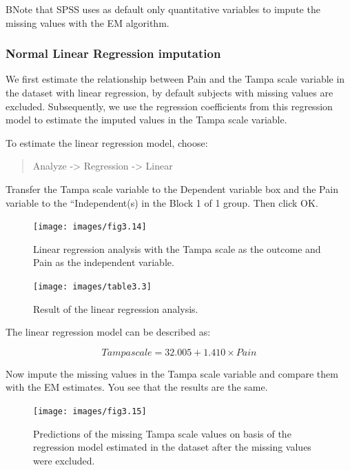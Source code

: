 \documentclass[
]{book}
\begin{document}
BNote that SPSS uses as default only quantitative variables to impute the missing values with the EM algorithm.

\hypertarget{normal-linear-regression-imputation}{%
\subsubsection{Normal Linear Regression imputation}\label{normal-linear-regression-imputation}}

We first estimate the relationship between Pain and the Tampa scale variable in the dataset with linear regression, by default subjects with missing values are excluded. Subsequently, we use the regression coefficients from this regression model to estimate the imputed values in the Tampa scale variable.

To estimate the linear regression model, choose:

\begin{quote}
Analyze -\textgreater{} Regression -\textgreater{} Linear
\end{quote}

Transfer the Tampa scale variable to the Dependent variable box and the Pain variable to the ``Independent(s) in the Block 1 of 1 group. Then click OK.

\begin{figure}

{\centering \texttt{[image: images/fig3.14]} 

}

\caption{Linear regression analysis with the Tampa scale as the outcome and Pain as the independent variable.}\label{fig:fig3-14}
\end{figure}

\begin{figure}

{\centering \texttt{[image: images/table3.3]} 

}

\caption{Result of the linear regression analysis.}\label{fig:tab3-3}
\end{figure}

The linear regression model can be described as:

\[Tampascale = 32.005 + 1.410 × Pain\]

Now impute the missing values in the Tampa scale variable and compare them with the EM estimates. You see that the results are the same.

\begin{figure}

{\centering \texttt{[image: images/fig3.15]} 

}

\caption{Predictions of the missing Tampa scale values on basis of the regression model estimated in the dataset after the missing values were excluded.}\label{fig:fig3-15}
\end{figure}
\end{document}
